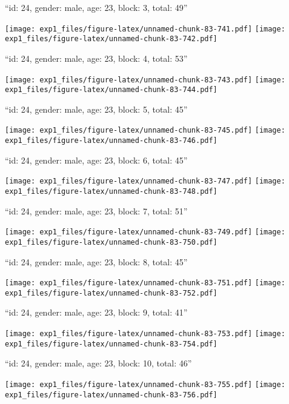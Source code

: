 \documentclass[11pt,,]{article}
\begin{document}
\newpage
[1] 

``id: 24, gender: male, age: 23, block: 3, total: 49''

\texttt{[image: exp1\_files/figure-latex/unnamed-chunk-83-741.pdf]}
\texttt{[image: exp1\_files/figure-latex/unnamed-chunk-83-742.pdf]}

\newpage
[1] 

``id: 24, gender: male, age: 23, block: 4, total: 53''

\texttt{[image: exp1\_files/figure-latex/unnamed-chunk-83-743.pdf]}
\texttt{[image: exp1\_files/figure-latex/unnamed-chunk-83-744.pdf]}

\newpage
[1] 

``id: 24, gender: male, age: 23, block: 5, total: 45''

\texttt{[image: exp1\_files/figure-latex/unnamed-chunk-83-745.pdf]}
\texttt{[image: exp1\_files/figure-latex/unnamed-chunk-83-746.pdf]}

\newpage
[1] 

``id: 24, gender: male, age: 23, block: 6, total: 45''

\texttt{[image: exp1\_files/figure-latex/unnamed-chunk-83-747.pdf]}
\texttt{[image: exp1\_files/figure-latex/unnamed-chunk-83-748.pdf]}

\newpage
[1] 

``id: 24, gender: male, age: 23, block: 7, total: 51''

\texttt{[image: exp1\_files/figure-latex/unnamed-chunk-83-749.pdf]}
\texttt{[image: exp1\_files/figure-latex/unnamed-chunk-83-750.pdf]}

\newpage
[1] 

``id: 24, gender: male, age: 23, block: 8, total: 45''

\texttt{[image: exp1\_files/figure-latex/unnamed-chunk-83-751.pdf]}
\texttt{[image: exp1\_files/figure-latex/unnamed-chunk-83-752.pdf]}

\newpage
[1] 

``id: 24, gender: male, age: 23, block: 9, total: 41''

\texttt{[image: exp1\_files/figure-latex/unnamed-chunk-83-753.pdf]}
\texttt{[image: exp1\_files/figure-latex/unnamed-chunk-83-754.pdf]}

\newpage
[1] 

``id: 24, gender: male, age: 23, block: 10, total: 46''

\texttt{[image: exp1\_files/figure-latex/unnamed-chunk-83-755.pdf]}
\texttt{[image: exp1\_files/figure-latex/unnamed-chunk-83-756.pdf]}
\end{document}
